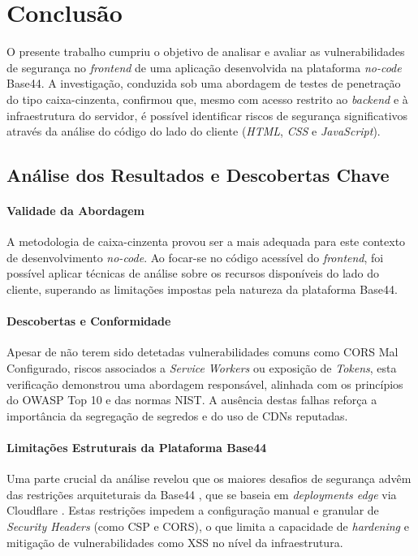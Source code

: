 \section{Conclusão}

O presente trabalho cumpriu o objetivo de analisar e avaliar as vulnerabilidades de segurança no \textit{frontend} de uma aplicação desenvolvida na plataforma \textit{no-code} Base44.
A investigação, conduzida sob uma abordagem de testes de penetração do tipo caixa-cinzenta, confirmou que, mesmo com acesso restrito ao \textit{backend} e à infraestrutura do servidor,
é possível identificar riscos de segurança significativos através da análise do código do lado do cliente (\textit{HTML}, \textit{CSS} e \textit{JavaScript}).

\subsection{Análise dos Resultados e Descobertas Chave}

\paragraph{Validade da Abordagem}
A metodologia de caixa-cinzenta provou ser a mais adequada para este contexto de desenvolvimento \textit{no-code}.
Ao focar-se no código acessível do \textit{frontend}, foi possível aplicar técnicas de análise sobre os recursos disponíveis do lado do cliente,
superando as limitações impostas pela natureza da plataforma Base44.

\paragraph{Descobertas e Conformidade}
Apesar de não terem sido detetadas vulnerabilidades comuns como CORS Mal Configurado, riscos associados a \textit{Service Workers} ou exposição de \textit{Tokens},
esta verificação demonstrou uma abordagem responsável, alinhada com os princípios do OWASP Top 10 e das normas NIST.
A ausência destas falhas reforça a importância da segregação de segredos \cite{ref12} e do uso de CDNs reputadas.

\paragraph{Limitações Estruturais da Plataforma Base44}
Uma parte crucial da análise revelou que os maiores desafios de segurança advêm das restrições arquiteturais da Base44 \cite{ref16},
que se baseia em \textit{deployments edge} via Cloudflare \cite{ref17}.
Estas restrições impedem a configuração manual e granular de \textit{Security Headers} (como CSP e CORS),
o que limita a capacidade de \textit{hardening} e mitigação de vulnerabilidades como XSS no nível da infraestrutura.

